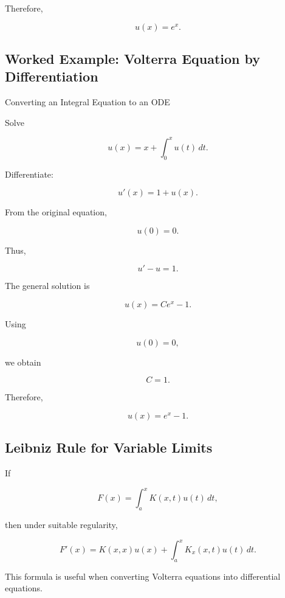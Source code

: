 Therefore,

\[
\boxed{
u(x)=e^x.
}
\]

\subsection{Worked Example: Volterra Equation by Differentiation}
\label{subsec:worked-volterra-differentiation}

\begin{workedexamplebox}{Converting an Integral Equation to an ODE}

Solve

\[
u(x)
=
x
+
\int_0^x
u(t)\,dt.
\]

Differentiate:

\[
u'(x)
=
1+u(x).
\]

From the original equation,

\[
u(0)=0.
\]

Thus,

\[
u'-u=1.
\]

The general solution is

\[
u(x)
=
Ce^x-1.
\]

Using

\[
u(0)=0,
\]

we obtain

\[
C=1.
\]

Therefore,

\begin{answerbox}
\[
\boxed{
u(x)
=
e^x-1.
}
\]
\end{answerbox}

\end{workedexamplebox}

\subsection{Leibniz Rule for Variable Limits}
\label{subsec:leibniz-rule-integral-equations}

If

\[
F(x)
=
\int_a^x
K(x,t)u(t)\,dt,
\]

then under suitable regularity,

\[
\boxed{
F'(x)
=
K(x,x)u(x)
+
\int_a^x
K_x(x,t)u(t)\,dt.
}
\]

This formula is useful when converting Volterra equations into
differential equations.

